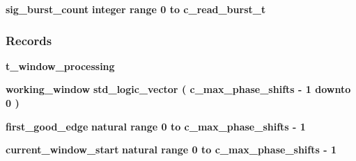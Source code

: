 \begin{DoxyCompactItemize}
\item 
{\bf sig\+\_\+burst\+\_\+count} {\bfseries \textcolor{comment}{integer}\textcolor{vhdlchar}{ }\textcolor{vhdlchar}{ }\textcolor{vhdlchar}{ }\textcolor{keywordflow}{range}\textcolor{vhdlchar}{ }\textcolor{vhdlchar}{ } \textcolor{vhdldigit}{0} \textcolor{vhdlchar}{ }\textcolor{keywordflow}{to}\textcolor{vhdlchar}{ }\textcolor{vhdlchar}{ }\textcolor{vhdlchar}{ }\textcolor{vhdlchar}{ }{\bfseries {\bf c\+\_\+read\+\_\+burst\+\_\+t}} \textcolor{vhdlchar}{ }} 
\end{DoxyCompactItemize}
\subsubsection*{Records}
 \begin{DoxyCompactItemize}
\item 
{\bf t\+\_\+window\+\_\+processing} {\bfseries  }
\item 
{\bf working\+\_\+window} {\bfseries {\bfseries \textcolor{comment}{std\+\_\+logic\+\_\+vector}\textcolor{vhdlchar}{ }\textcolor{vhdlchar}{(}\textcolor{vhdlchar}{ }\textcolor{vhdlchar}{ }\textcolor{vhdlchar}{ }\textcolor{vhdlchar}{ }{\bfseries {\bf c\+\_\+max\+\_\+phase\+\_\+shifts}} \textcolor{vhdlchar}{-\/}\textcolor{vhdlchar}{ } \textcolor{vhdldigit}{1} \textcolor{vhdlchar}{ }\textcolor{keywordflow}{downto}\textcolor{vhdlchar}{ }\textcolor{vhdlchar}{ } \textcolor{vhdldigit}{0} \textcolor{vhdlchar}{ }\textcolor{vhdlchar}{)}\textcolor{vhdlchar}{ }}} 
\item 
{\bf first\+\_\+good\+\_\+edge} {\bfseries {\bfseries \textcolor{comment}{natural}\textcolor{vhdlchar}{ }\textcolor{vhdlchar}{ }\textcolor{vhdlchar}{ }\textcolor{keywordflow}{range}\textcolor{vhdlchar}{ }\textcolor{vhdlchar}{ } \textcolor{vhdldigit}{0} \textcolor{vhdlchar}{ }\textcolor{keywordflow}{to}\textcolor{vhdlchar}{ }\textcolor{vhdlchar}{ }\textcolor{vhdlchar}{ }\textcolor{vhdlchar}{ }{\bfseries {\bf c\+\_\+max\+\_\+phase\+\_\+shifts}} \textcolor{vhdlchar}{-\/}\textcolor{vhdlchar}{ } \textcolor{vhdldigit}{1} \textcolor{vhdlchar}{ }}} 
\item 
{\bf current\+\_\+window\+\_\+start} {\bfseries {\bfseries \textcolor{comment}{natural}\textcolor{vhdlchar}{ }\textcolor{vhdlchar}{ }\textcolor{vhdlchar}{ }\textcolor{keywordflow}{range}\textcolor{vhdlchar}{ }\textcolor{vhdlchar}{ } \textcolor{vhdldigit}{0} \textcolor{vhdlchar}{ }\textcolor{keywordflow}{to}\textcolor{vhdlchar}{ }\textcolor{vhdlchar}{ }\textcolor{vhdlchar}{ }\textcolor{vhdlchar}{ }{\bfseries {\bf c\+\_\+max\+\_\+phase\+\_\+shifts}} \textcolor{vhdlchar}{-\/}\textcolor{vhdlchar}{ } \textcolor{vhdldigit}{1} \textcolor{vhdlchar}{ }}} 

\end{DoxyCompactItemize}
